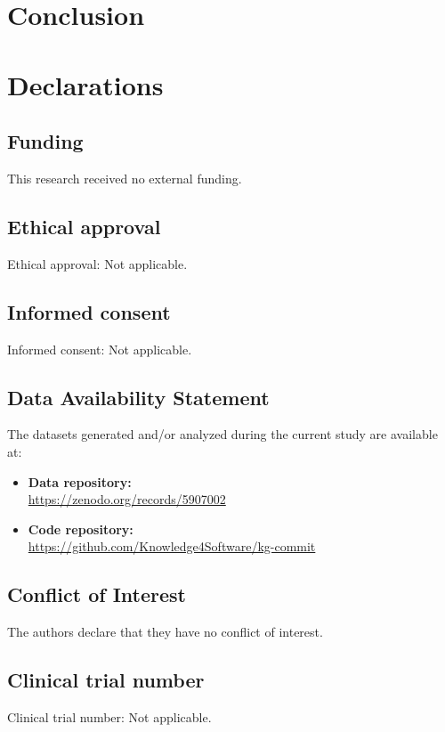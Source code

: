 \documentclass[final,5p,times,twocolumn]{elsarticle}
\theoremstyle{plain}
\begin{document}
\section{Conclusion}
\label{sec:conclusion}

\section{Declarations}

\subsection{Funding}
This research received no external funding.

\subsection{Ethical approval}
Ethical approval: Not applicable.

\subsection{Informed consent}
Informed consent: Not applicable.

\subsection{Data Availability Statement}
The datasets generated and/or analyzed during the current study are available at:
\begin{itemize}
    \item \textbf{Data repository:}\\ \url{https://zenodo.org/records/5907002}
    \item \textbf{Code repository:}\\ \url{https://github.com/Knowledge4Software/kg-commit}
\end{itemize}

\subsection{Conflict of Interest}
The authors declare that they have no conflict of interest.

\subsection{Clinical trial number}
Clinical trial number: Not applicable.
\end{document}
